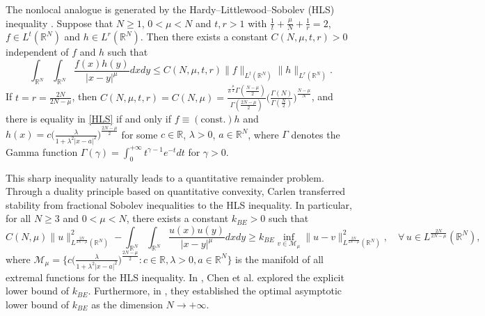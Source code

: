 \documentclass[11pt]{article}
\begin{document}
{The nonlocal analogue is generated by the Hardy--Littlewood--Sobolev (HLS) inequality \cite{HL28,L83,LL01}. Suppose that} $N\geq 1$, $0<\mu< N$ and $t,r>1$ with $\frac{1}{t}+\frac{\mu}{N}+\frac{1}{r}=2$, $f\in L^{t}(\mathbb{R}^{N})$ and $h\in L^{r}(\mathbb{R}^{N})$. Then there exists a constant ${C}(N,\mu,t,r)>0$ independent of $f$ and $h$ such that
\begin{equation}\label{HLS}
 \displaystyle\int_{\mathbb{R}^N}\int_{\mathbb{R}^N}\frac{f(x)h(y)}{|x-y|^\mu}dxdy\leq C(N,\mu,t,r)\|f\|_{L^t(\mathbb{R}^N)}\|h\|_{L^r(\mathbb{R}^N)}.
\end{equation}
If $t=r=\frac{2N}{2N-\mu}$, then ${C}(N,\mu,t,r)=C(N,\mu)=\frac{\pi^{\frac{\mu}{2}}\Gamma(\frac{N-\mu}{2})}{\Gamma(
 \frac{2N-\mu}{2})}\Big(\frac{\Gamma(N)}{\Gamma(\frac{N}{2})}\Big)^{\frac{N-\mu}{N}}$,
and there is equality in \eqref{HLS} if and only if $f\equiv (\mathrm{const}.)h$ and $h(x)=c\big(\frac{\lambda}{1+\lambda^{2}|x-a|^{2}}\big)
^{\frac{2N-\mu}{2}}$ for some $c\in \mathbb{R}$, $\lambda>0$, $a\in\mathbb{R}^{N}$,
where
$\Gamma$ denotes the Gamma function $\Gamma(\gamma)=\int_0^{+\infty}t^{\gamma-1}e^{-t}dt$ for $\gamma>0$.


{This sharp inequality naturally leads to a quantitative remainder problem. Through a duality principle based on quantitative convexity, Carlen \cite{C17} transferred stability from fractional Sobolev inequalities to the HLS inequality. In particular,} for all $N\geq3$ and $0<\mu<N$, there exists a constant $k_{BE}>0$ such that
\begin{equation*}
C(N,\mu)\|u\|^2_{L^{\frac{2N}{2N-\mu}}(\mathbb{R}^N)}-
\int_{\mathbb{R}^{N}}\int_{\mathbb{R}^{N}}
\frac{u(x)u(y)}{|x-y|^\mu}dxdy
\geq k_{BE} \inf\limits_{v\in \mathcal{M}_\mu} \|u-v\|^2_{L^{\frac{2N}{2N-\mu}}(\mathbb{R}^N)},
 \quad \forall \, u\in L^{\frac{2N}{2N-\mu}}(\mathbb{R}^{N}),
\end{equation*}
where $\mathcal{M}_\mu=\Big\{c\big(\frac{\lambda}{1+\lambda^{2}|x-a|^{2}}\big)
^{\frac{2N-\mu}{2}}:c\in \mathbb{R},\lambda>0,a\in\mathbb{R}^{N}\Big\}$
is the manifold of all extremal functions for the HLS inequality. In \cite{CLT24'}, Chen et al. explored the explicit lower bound of $k_{BE}$. Furthermore, in \cite{CLT25,CLT24}, they established the
optimal asymptotic lower bound of $k_{BE}$ as the dimension $N\rightarrow+\infty$.
\end{document}
